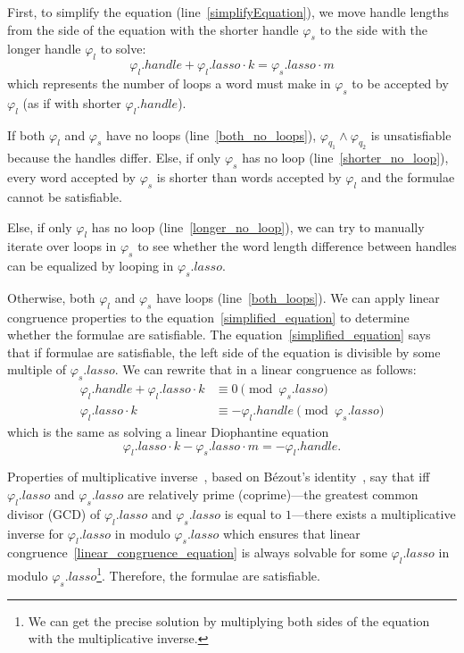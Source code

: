 First, to simplify the equation (line~\ref{simplifyEquation}), we move handle lengths from the side of the equation with the shorter handle $\varphi_s$ to the side with the longer handle $\varphi_l$ to solve:
\begin{equation}\label{simplified_equation}
    \varphi_{l}.handle + \varphi_{l}.lasso \cdot k = \varphi_{s}.lasso \cdot m
\end{equation}
which represents the number of loops a word must make in $\varphi_{s}$ to be accepted by $\varphi_l$ (as if with shorter $\varphi_l.handle$).

If both $\varphi_l$ and $\varphi_s$ have no loops (line~\ref{both_no_loops}), $\varphi_{q_1} \land \varphi_{q_2}$ is unsatisfiable because the handles differ. Else, if only $\varphi_s$ has no loop (line~\ref{shorter_no_loop}), every word accepted by $\varphi_s$ is shorter than words accepted by $\varphi_l$ and the formulae cannot be satisfiable.

Else, if only $\varphi_l$ has no loop (line~\ref{longer_no_loop}), we can try to manually iterate over loops in $\varphi_s$ to see whether the word length difference between handles can be equalized by looping in $\varphi_s.lasso$.

Otherwise, both $\varphi_l$ and $\varphi_s$ have loops (line~\ref{both_loops}). We can apply linear congruence properties to the equation~\ref{simplified_equation} to determine whether the formulae are satisfiable. The equation~\ref{simplified_equation} says that if formulae are satisfiable, the left side of the equation is divisible by some multiple of $\varphi_s.lasso$. We can rewrite that in a linear congruence as follows:
\begin{align}
    \varphi_{l}.handle + \varphi_{l}.lasso \cdot k &\equiv 0 \pmod{\varphi_s.lasso} \\
    \varphi_{l}.lasso \cdot k &\equiv - \varphi_{l}.handle  \pmod{\varphi_s.lasso} \label{linear_congruence_equation}
\end{align}
which is the same as solving a linear Diophantine equation
\begin{equation}
    \varphi_{l}.lasso \cdot k - \varphi_s.lasso \cdot m = - \varphi_{l}.handle \text{.} \label{linear_diophantine_equation}
\end{equation}

Properties of multiplicative inverse~\cite{DivisibilityAndGreatestCommonDiviser, LinearCongruences}, based on Bézout's identity~\cite{DivisibilityAndGreatestCommonDiviser}, say that iff $\varphi_l.lasso$ and $\varphi_s.lasso$ are relatively prime (coprime)---the greatest common divisor (GCD) of $\varphi_l.lasso$ and $\varphi_s.lasso$ is equal to $1$---there exists a multiplicative inverse for $\varphi_l.lasso$ in modulo $\varphi_s.lasso$ which ensures that linear congruence~\ref{linear_congruence_equation} is always solvable for some $\varphi_l.lasso$ in modulo $\varphi_s.lasso$\footnote{We can get the precise solution by multiplying both sides of the equation with the multiplicative inverse.}. Therefore, the formulae are satisfiable.

